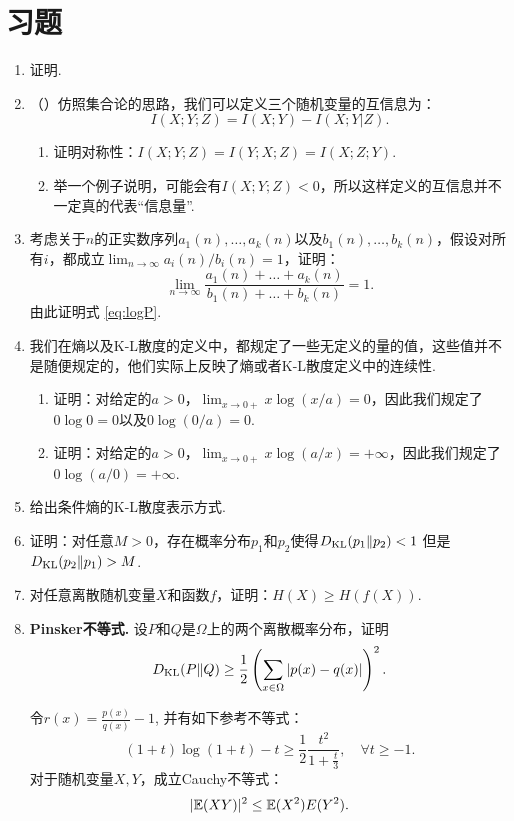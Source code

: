 \section{习题}
\begin{enumerate}[wide, labelindent=0pt]
    \item \label{exercise:conditional-mutual-information} 证明. 
    
    \item （\cite{tingAmountInformation1962}）仿照集合论的思路，我们可以定义三个随机变量的互信息为：
    \[I(X;Y;Z)=I(X;Y)-I(X;Y|Z).\]
    \begin{enumerate}
        \item 证明对称性：$I(X;Y;Z)=I(Y;X;Z) = I(X;Z;Y)$.
        \item 举一个例子说明，可能会有$I(X;Y;Z)<0$，所以这样定义的互信息并不一定真的代表“信息量”.
    \end{enumerate}

    \item 考虑关于$n$的正实数序列$a_1(n),\dots,a_k(n)$以及$b_1(n),\dots,b_k(n)$，假设对所有$i$，都成立$\lim_{n\to\infty} a_i(n)/b_i(n)=1$，证明：
    \[\lim_{n\to\infty}\frac{a_1(n)+\dots+a_k(n)}{b_1(n)+\dots+b_k(n)}=1.\]
    由此证明式 \eqref{eq:logP}.

    \item 我们在熵以及K-L散度的定义中，都规定了一些无定义的量的值，这些值并不是随便规定的，他们实际上反映了熵或者K-L散度定义中的连续性.
    \begin{enumerate}
        \item 证明：对给定的$a>0$，$\lim_{x\to 0+}x\log (x/a)=0$，因此我们规定了$0\log 0=0$以及$0\log(0/a)=0$.
        \item 证明：对给定的$a>0$，$\lim_{x\to 0+}x\log (a/x)=+\infty$，因此我们规定了$0\log(a/0)=+\infty$.
    \end{enumerate}

    \item 给出条件熵的K-L散度表示方式.
    
    
    \item \label{exercise:kl-divergence-asymmetry} 证明：对任意$M>0$，存在概率分布$p_1$和$p_2$使得$D_{\mathrm{KL}}(p_{1}\Vert p_{2})<1$ 但是 $D_{\mathrm{KL}}(p_{2}\Vert p_{1})>M$.
    
    \item 对任意离散随机变量$X$和函数$f$，证明：$H(X)\geq H(f(X))$.
    
    \item \textbf{Pinsker不等式. }设$P$和$Q$是$\Omega$上的两个离散概率分布，证明
    \[
        D_{\mathrm{KL}}(P\Vert Q) \geq \frac{1}{2} \left(\sum_{x\in \Omega} |p(x) - q(x)|\right)^2.
    \]
    \begin{hint}
        令$r(x) = \frac{p(x)}{q(x)} - 1$, 并有如下参考不等式：
        \[
            (1+t) \log (1+t) - t \geqslant \frac{1}{2} \frac{t^2}{1+\frac{t}{3}}, \quad \forall t \geqslant -1.
        \]
        对于随机变量$X,Y$，成立Cauchy不等式：
        \[
            |\mathbb{E}(XY)|^2 \leq \mathbb{E}(X^2)E(Y^2).
        \]
    \end{hint}


\end{enumerate}
